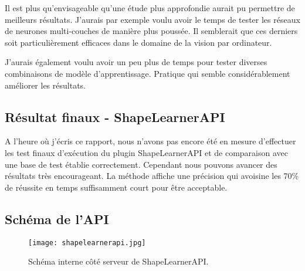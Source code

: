 Il est plus qu'envisageable qu'une étude plus approfondie aurait pu permettre de meilleurs résultats. J'aurais par exemple voulu avoir le temps de tester les réseaux de neurones multi-couches de manière plus poussée. Il semblerait que ces derniers soit particulièrement efficaces dans le domaine de la vision par ordinateur.

J'aurais également voulu avoir un peu plus de temps pour tester diverses combinaisons de modèle d'apprentissage. Pratique qui semble considérablement améliorer les résultats.

\subsection{Résultat finaux - ShapeLearnerAPI}

A l'heure où j'écris ce rapport, nous n'avons pas encore été en mesure d'effectuer les test finaux d'exécution du plugin ShapeLearnerAPI et de comparaison avec une base de test établie correctement. Cependant nous pouvons avancer des résultats très encourageant. La méthode affiche une précision qui avoisine les 70\% de réussite en temps suffisamment court pour être acceptable.

\subsection{Schéma de l'API}

 \begin{figure}[H]
    \centering
    \texttt{[image: shapelearnerapi.jpg]}
	\caption{Schéma interne côté serveur de ShapeLearnerAPI.}\label{image.ShapeAPIScheme} 
\end{figure}

\clearpage